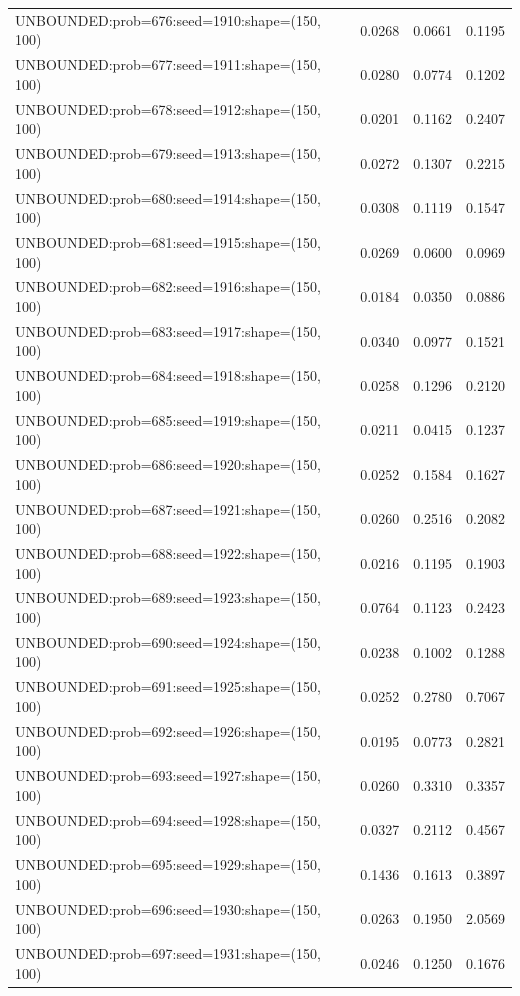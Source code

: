 \begin{longtable}{lccc}
UNBOUNDED:prob=676:seed=1910:shape=(150, 100) &   0.0268 &  0.0661 &  0.1195 \\
UNBOUNDED:prob=677:seed=1911:shape=(150, 100) &   0.0280 &  0.0774 &  0.1202 \\
UNBOUNDED:prob=678:seed=1912:shape=(150, 100) &   0.0201 &  0.1162 &  0.2407 \\
UNBOUNDED:prob=679:seed=1913:shape=(150, 100) &   0.0272 &  0.1307 &  0.2215 \\
UNBOUNDED:prob=680:seed=1914:shape=(150, 100) &   0.0308 &  0.1119 &  0.1547 \\
UNBOUNDED:prob=681:seed=1915:shape=(150, 100) &   0.0269 &  0.0600 &  0.0969 \\
UNBOUNDED:prob=682:seed=1916:shape=(150, 100) &   0.0184 &  0.0350 &  0.0886 \\
UNBOUNDED:prob=683:seed=1917:shape=(150, 100) &   0.0340 &  0.0977 &  0.1521 \\
UNBOUNDED:prob=684:seed=1918:shape=(150, 100) &   0.0258 &  0.1296 &  0.2120 \\
UNBOUNDED:prob=685:seed=1919:shape=(150, 100) &   0.0211 &  0.0415 &  0.1237 \\
UNBOUNDED:prob=686:seed=1920:shape=(150, 100) &   0.0252 &  0.1584 &  0.1627 \\
UNBOUNDED:prob=687:seed=1921:shape=(150, 100) &   0.0260 &  0.2516 &  0.2082 \\
UNBOUNDED:prob=688:seed=1922:shape=(150, 100) &   0.0216 &  0.1195 &  0.1903 \\
UNBOUNDED:prob=689:seed=1923:shape=(150, 100) &   0.0764 &  0.1123 &  0.2423 \\
UNBOUNDED:prob=690:seed=1924:shape=(150, 100) &   0.0238 &  0.1002 &  0.1288 \\
UNBOUNDED:prob=691:seed=1925:shape=(150, 100) &   0.0252 &  0.2780 &  0.7067 \\
UNBOUNDED:prob=692:seed=1926:shape=(150, 100) &   0.0195 &  0.0773 &  0.2821 \\
UNBOUNDED:prob=693:seed=1927:shape=(150, 100) &   0.0260 &  0.3310 &  0.3357 \\
UNBOUNDED:prob=694:seed=1928:shape=(150, 100) &   0.0327 &  0.2112 &  0.4567 \\
UNBOUNDED:prob=695:seed=1929:shape=(150, 100) &   0.1436 &  0.1613 &  0.3897 \\
UNBOUNDED:prob=696:seed=1930:shape=(150, 100) &   0.0263 &  0.1950 &  2.0569 \\
UNBOUNDED:prob=697:seed=1931:shape=(150, 100) &   0.0246 &  0.1250 &  0.1676 \\

\end{longtable}
